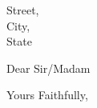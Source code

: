 \documentclass[draft, 11pt, letterpaper]{letter}
\begin{document}
\address{
    Street,\\
    City,\\
    State
}
\signature{HUANG Zonghao}
\begin{letter}{
    Street,\\
    City,\\
    State\\
}
\opening{Dear Sir/Madam}



\closing{Yours Faithfully,}
\end{letter}
\end{document}
